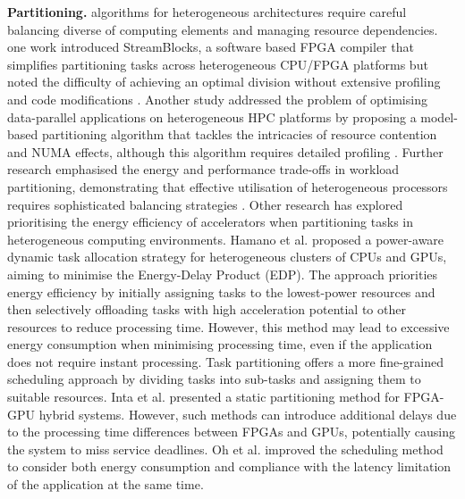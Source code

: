 \documentclass[]{spie}  %
\begin{document}
\noindent\textbf{Partitioning.} algorithms for heterogeneous architectures require careful balancing diverse of computing elements and managing resource dependencies\cite{shekhar2015}. one work introduced StreamBlocks, a software based FPGA compiler that simplifies partitioning tasks across heterogeneous CPU/FPGA platforms but noted the difficulty of achieving an optimal division without extensive profiling and code modifications \cite{emami2022}. Another study addressed the problem of optimising data-parallel applications on heterogeneous HPC platforms by proposing a model-based partitioning algorithm that tackles the intricacies of resource contention and NUMA effects, although this algorithm requires detailed profiling \cite{khaleghzadeh2018}. Further research emphasised the energy and performance trade-offs in workload partitioning, demonstrating that effective utilisation of heterogeneous processors requires sophisticated balancing strategies \cite{tang2017}. Other research has explored prioritising the energy efficiency of accelerators when partitioning tasks in heterogeneous computing environments. Hamano et al.\cite{Hamano} proposed a power-aware dynamic task allocation strategy for heterogeneous clusters of CPUs and GPUs, aiming to minimise the Energy-Delay Product (EDP). The approach priorities energy efficiency by initially assigning tasks to the lowest-power resources and then selectively offloading tasks with high acceleration potential to other resources to reduce processing time. However, this method may lead to excessive energy consumption when minimising processing time, even if the application does not require instant processing. Task partitioning offers a more fine-grained scheduling approach by dividing tasks into sub-tasks and assigning them to suitable resources. Inta et al.\cite{IntBowDav12} presented a static partitioning method for FPGA-GPU hybrid systems. However, such methods can introduce additional delays due to the processing time differences between FPGAs and GPUs, potentially causing the system to miss service deadlines. Oh et al.\cite{OhHanYan18} improved the scheduling method to consider both energy consumption and compliance with the latency limitation of
the application at the same time.
\end{document}
